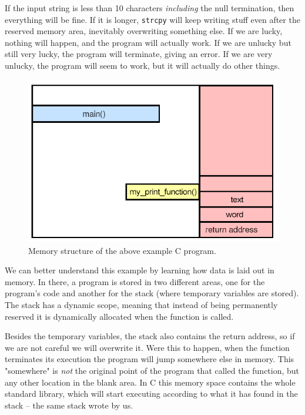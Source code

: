 If the input string is less than 10 characters \textit{including} the null termination, then everything will be fine. If it is longer, \texttt{strcpy} will keep writing stuff even after the reserved memory area, inevitably overwriting something else. If we are lucky, nothing will happen, and the program will actually work. If we are unlucky but still very lucky, the program will terminate, giving an error. If we are very unlucky, the program will seem to work, but it will actually do other things.

\begin{figure}[h]
    \centering
    \includegraphics[scale=0.5]{img/buffer_overflow_example.png}
    \decoRule
    \caption{Memory structure of the above example C program.}
    \label{fig:buffer_overflow_example}
\end{figure}

\vspace{0.5em}

We can better understand this example by learning how data is laid out in memory. In there, a program is stored in two different areas, one for the program’s code and another for the stack (where temporary variables are stored). The stack has a dynamic scope, meaning that instead of being permanently reserved it is dynamically allocated when the function is called.

Besides the temporary variables, the stack also contains the return address, so if we are not careful we will overwrite it. Were this to happen, when the function terminates its execution the program will jump somewhere else in memory. This "somewhere" is \textit{not} the original point of the program that called the function, but any other location in the blank area. In C this memory space contains the whole standard library, which will start executing according to what it has found in the stack – the same stack wrote by us.

